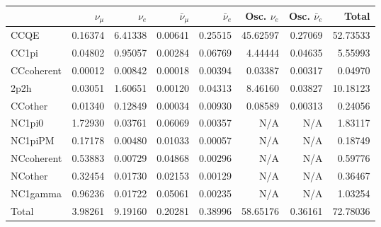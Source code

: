 %
%
%
%
%
%
%
\begin{table}
	\centering
	\begin{tabular} { | l ||r | r | r | r | r | r | | r | }
	\hline
	              & $\nu_\mu$            & $\nu_e$              & $\bar{\nu}_{\mu}$    & $\bar{\nu}_{e}$      & Osc. $\nu_e$         & Osc. $\bar{\nu}_{e}$ & Total                \\ \hline\hline
	 CCQE         & 0.16374              & 6.41338              & 0.00641              & 0.25515              & 45.62597             & 0.27069              & 52.73533             \\ \hline
	 CC1pi        & 0.04802              & 0.95057              & 0.00284              & 0.06769              & 4.44444              & 0.04635              & 5.55993              \\ \hline
	 CCcoherent   & 0.00012              & 0.00842              & 0.00018              & 0.00394              & 0.03387              & 0.00317              & 0.04970              \\ \hline
	 2p2h         & 0.03051              & 1.60651              & 0.00120              & 0.04313              & 8.46160              & 0.03827              & 10.18123             \\ \hline
	 CCother      & 0.01340              & 0.12849              & 0.00034              & 0.00930              & 0.08589              & 0.00313              & 0.24056              \\ \hline
	 NC1pi0       & 1.72930              & 0.03761              & 0.06069              & 0.00357              & N/A                  & N/A                  & 1.83117              \\ \hline
	 NC1piPM      & 0.17178              & 0.00480              & 0.01033              & 0.00057              & N/A                  & N/A                  & 0.18749              \\ \hline
	 NCcoherent   & 0.53883              & 0.00729              & 0.04868              & 0.00296              & N/A                  & N/A                  & 0.59776              \\ \hline
	 NCother      & 0.32454              & 0.01730              & 0.02153              & 0.00129              & N/A                  & N/A                  & 0.36467              \\ \hline
	 NC1gamma     & 0.96236              & 0.01722              & 0.05061              & 0.00235              & N/A                  & N/A                  & 1.03254              \\ \hline
	\hline
	 Total        & 3.98261              & 9.19160              & 0.20281              & 0.38996              & 58.65176             & 0.36161              & 72.78036             \\ \hline
	

\end{tabular}
\end{table}
